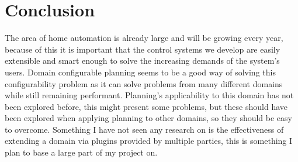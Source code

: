 \section{Conclusion}
The area of home automation is already large and will be growing every year,
because of this it is important that the control systems we develop are easily
extensible and smart enough to solve the increasing demands of the system's
users. Domain configurable planning seems to be a good way of solving this
configurability problem as it can solve problems from many different domains
while still remaining performant. Planning's applicability to this domain has
not been explored before, this might present some problems, but these should
have been explored when applying planning to other domains, so they should be
easy to overcome. Something I have not seen any research on is the effectiveness
of extending a domain via plugins provided by multiple parties, this is
something I plan to base a large part of my project on.

